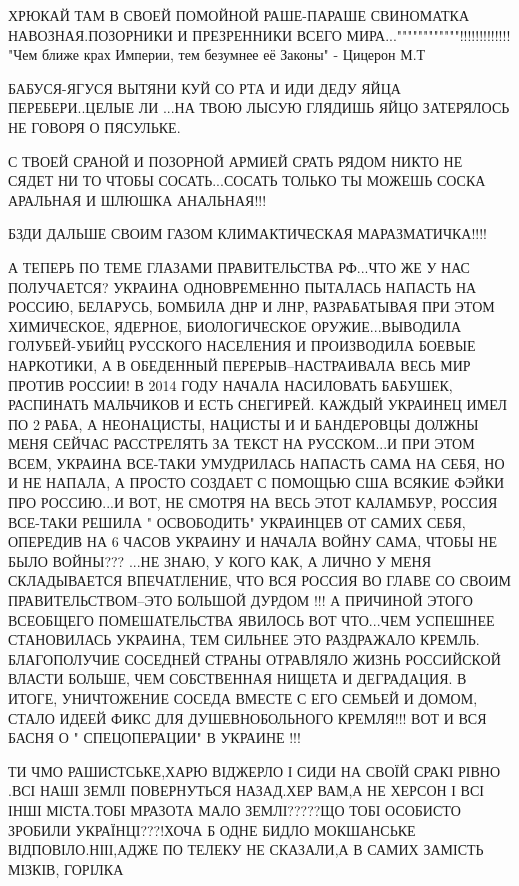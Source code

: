 ХРЮКАЙ ТАМ В СВОЕЙ ПОМОЙНОЙ РАШЕ-ПАРАШЕ СВИНОМАТКА НАВОЗНАЯ.ПОЗОРНИКИ И
ПРЕЗРЕННИКИ ВСЕГО МИРА...""""""""""""!!!!!!!!!!!!!
"Чем ближе крах Империи, тем безумнее её Законы" - Цицерон М.Т

БАБУСЯ-ЯГУСЯ ВЫТЯНИ КУЙ СО РТА И ИДИ ДЕДУ ЯЙЦА ПЕРЕБЕРИ..ЦЕЛЫЕ ЛИ ...НА ТВОЮ
ЛЫСУЮ ГЛЯДИШЬ ЯЙЦО ЗАТЕРЯЛОСЬ НЕ ГОВОРЯ О ПЯСУЛЬКЕ.

С ТВОЕЙ СРАНОЙ И ПОЗОРНОЙ АРМИЕЙ СРАТЬ РЯДОМ НИКТО НЕ СЯДЕТ НИ ТО ЧТОБЫ
СОСАТЬ...СОСАТЬ ТОЛЬКО ТЫ МОЖЕШЬ СОСКА АРАЛЬНАЯ И ШЛЮШКА АНАЛЬНАЯ!!!

БЗДИ ДАЛЬШЕ СВОИМ ГАЗОМ КЛИМАКТИЧЕСКАЯ МАРАЗМАТИЧКА!!!!

А ТЕПЕРЬ ПО ТЕМЕ ГЛАЗАМИ ПРАВИТЕЛЬСТВА РФ...ЧТО ЖЕ У НАС ПОЛУЧАЕТСЯ? УКРАИНА
ОДНОВРЕМЕННО ПЫТАЛАСЬ НАПАСТЬ НА РОССИЮ, БЕЛАРУСЬ, БОМБИЛА ДНР И ЛНР,
РАЗРАБАТЫВАЯ ПРИ ЭТОМ ХИМИЧЕСКОЕ, ЯДЕРНОЕ, БИОЛОГИЧЕСКОЕ ОРУЖИЕ...ВЫВОДИЛА
ГОЛУБЕЙ-УБИЙЦ РУССКОГО НАСЕЛЕНИЯ И ПРОИЗВОДИЛА БОЕВЫЕ НАРКОТИКИ, А В ОБЕДЕННЫЙ
ПЕРЕРЫВ--НАСТРАИВАЛА ВЕСЬ МИР ПРОТИВ РОССИИ! В 2014 ГОДУ НАЧАЛА НАСИЛОВАТЬ
БАБУШЕК, РАСПИНАТЬ МАЛЬЧИКОВ И ЕСТЬ СНЕГИРЕЙ. КАЖДЫЙ УКРАИНЕЦ ИМЕЛ ПО 2 РАБА, А
НЕОНАЦИСТЫ, НАЦИСТЫ И И БАНДЕРОВЦЫ ДОЛЖНЫ МЕНЯ СЕЙЧАС РАССТРЕЛЯТЬ ЗА ТЕКСТ НА
РУССКОМ...И ПРИ ЭТОМ ВСЕМ, УКРАИНА ВСЕ-ТАКИ УМУДРИЛАСЬ НАПАСТЬ САМА НА СЕБЯ, НО
И НЕ НАПАЛА, А ПРОСТО СОЗДАЕТ С ПОМОЩЬЮ США ВСЯКИЕ ФЭЙКИ ПРО РОССИЮ...И ВОТ, НЕ
СМОТРЯ НА ВЕСЬ ЭТОТ КАЛАМБУР, РОССИЯ ВСЕ-ТАКИ РЕШИЛА " ОСВОБОДИТЬ" УКРАИНЦЕВ ОТ
САМИХ СЕБЯ, ОПЕРЕДИВ НА 6 ЧАСОВ УКРАИНУ И НАЧАЛА ВОЙНУ САМА, ЧТОБЫ НЕ БЫЛО
ВОЙНЫ??? ...НЕ ЗНАЮ, У КОГО КАК, А ЛИЧНО У МЕНЯ СКЛАДЫВАЕТСЯ ВПЕЧАТЛЕНИЕ, ЧТО
ВСЯ РОССИЯ ВО ГЛАВЕ СО СВОИМ ПРАВИТЕЛЬСТВОМ--ЭТО БОЛЬШОЙ ДУРДОМ !!! А ПРИЧИНОЙ
ЭТОГО ВСЕОБЩЕГО ПОМЕШАТЕЛЬСТВА ЯВИЛОСЬ ВОТ ЧТО...ЧЕМ УСПЕШНЕЕ СТАНОВИЛАСЬ
УКРАИНА, ТЕМ СИЛЬНЕЕ ЭТО РАЗДРАЖАЛО КРЕМЛЬ. БЛАГОПОЛУЧИЕ СОСЕДНЕЙ СТРАНЫ
ОТРАВЛЯЛО ЖИЗНЬ РОССИЙСКОЙ ВЛАСТИ БОЛЬШЕ, ЧЕМ СОБСТВЕННАЯ НИЩЕТА И ДЕГРАДАЦИЯ.
В ИТОГЕ, УНИЧТОЖЕНИЕ СОСЕДА ВМЕСТЕ С ЕГО СЕМЬЕЙ И ДОМОМ, СТАЛО ИДЕЕЙ ФИКС ДЛЯ
ДУШЕВНОБОЛЬНОГО КРЕМЛЯ!!! ВОТ И ВСЯ БАСНЯ О " СПЕЦОПЕРАЦИИ" В УКРАИНЕ !!!

ТИ ЧМО РАШИСТСЬКЕ,ХАРЮ ВІДЖЕРЛО І СИДИ НА СВОЇЙ СРАКІ РІВНО .ВСІ НАШІ ЗЕМЛІ
ПОВЕРНУТЬСЯ НАЗАД.ХЕР ВАМ,А НЕ ХЕРСОН І ВСІ ІНШІ МІСТА.ТОБІ МРАЗОТА МАЛО
ЗЕМЛІ?????ЩО ТОБІ ОСОБИСТО ЗРОБИЛИ УКРАЇНЦІ???!ХОЧА Б ОДНЕ БИДЛО МОКШАНСЬКЕ
ВІДПОВІЛО.НІІІ,АДЖЕ ПО ТЕЛЕКУ НЕ СКАЗАЛИ,А В САМИХ ЗАМІСТЬ МІЗКІВ, ГОРІЛКА

